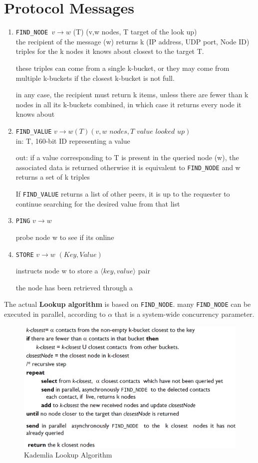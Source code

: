 \section{Protocol Messages}
\begin{enumerate}
   \item \texttt{FIND\_NODE $v\longrightarrow w$} (T) (v,w nodes, T target of the look up)\\
   the recipient of the message (w) returns k (IP address, UDP port, Node
   ID) triples for the k nodes it knows about closest to the target T.
   
   these triples can come from a single k-bucket, or they may come from multiple
   k-buckets if the closest k-bucket is not full.
   
   in any case, the recipient must return k items, unless there are fewer than k
   nodes in all its k-buckets combined, in which case it returns every node it
   knows about 



   
   \item \texttt{FIND\_VALUE} $v \longrightarrow w(T)(v,w \textit{ nodes}, T \textit{ value looked up})$\\
   in: T, 160-bit ID representing a value
   
   out:
   if a value corresponding to T is present in the queried node (w), the
   associated data is returned
   otherwise it is equivalent to \texttt{FIND\_NODE} and w returns a set of k triples
   
   If \texttt{FIND\_VALUE} returns a list of other peers, it is up to the requester to continue
   searching for the desired value from that list
   
   \item \texttt{PING} $v \longrightarrow w$
   
   probe node w to see if its online
   \item \texttt{STORE} $v \longrightarrow w$ $(Key, Value)$
   
   instructs node w to store a $\langle key, value \rangle$ pair
   
   the node has been retrieved through a
\end{enumerate}
The actual \textbf{Lookup algorithm} is based on \texttt{FIND\_NODE}.
many \texttt{FIND\_NODE} can be executed in parallel, according to $\alpha$ that is a system-wide concurrency parameter.

\begin{figure}[htbp]
   \centering
   \includegraphics{images/kademlia_algorithm.png}
   \caption{Kademlia Lookup Algorithm}
   \label{fig:kademlia_algorithm}
\end{figure}